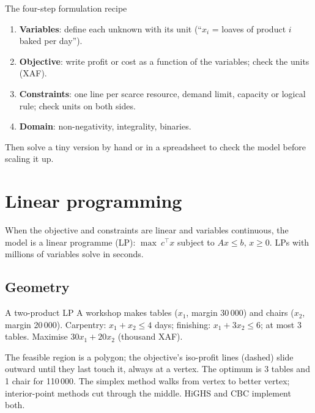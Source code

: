 \begin{keyformula}{The four-step formulation recipe}
\begin{enumerate}[nosep]
\item \textbf{Variables}: define each unknown with its unit (``$x_i$ = loaves of product $i$ baked per day'').
\item \textbf{Objective}: write profit or cost as a function of the variables; check the units (XAF).
\item \textbf{Constraints}: one line per scarce resource, demand limit, capacity or logical rule; check units on both sides.
\item \textbf{Domain}: non-negativity, integrality, binaries.
\end{enumerate}
Then solve a tiny version by hand or in a spreadsheet to check the model before scaling it up.
\end{keyformula}

\section{Linear programming}
When the objective and constraints are linear and variables continuous, the model is a linear programme (LP):
$\max\ c^\top x$ subject to $Ax\le b$, $x\ge0$. LPs with millions of variables solve in seconds.

\subsection{Geometry}
\begin{example}{A two-product LP}
A workshop makes tables ($x_1$, margin 30\,000\xaf) and chairs ($x_2$, margin 20\,000\xaf). Carpentry: $x_1+x_2\le4$
days; finishing: $x_1+3x_2\le6$; at most 3 tables. Maximise $30x_1+20x_2$ (thousand XAF).
\begin{center}
\end{center}
The feasible region is a polygon; the objective's iso-profit lines (dashed) slide outward until they last touch it,
always at a vertex. The optimum is 3 tables and 1 chair for 110\,000\xaf. The simplex method walks from vertex to
better vertex; interior-point methods cut through the middle. HiGHS and CBC implement both.
\end{example}


